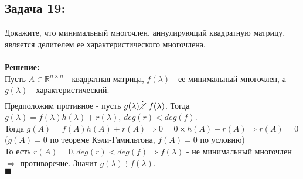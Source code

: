 \documentclass[a4paper,12pt,titlepage,final]{article}
\begin{document}
\subsection*{Задача 19:}
\noindent Докажите, что минимальный многочлен, аннулирующий квадратную матрицу, является 
делителем ее характеристического многочлена. \\ \\
\textbf{\underline{Решение:}} \\
Пусть $A \in \mathbb{R}^{n \times n}$ - квадратная матрица, $f(\lambda)$ - ее минимальный многочлен, 
а $g(\lambda)$ - характеристический. \\
Предположим противное - пусть $g(\lambda) \mathrel{\vdots \hspace{-0.60em} \diagup} f(\lambda)$.
Тогда $g(\lambda) = f(\lambda)h(\lambda) + r(\lambda)$, $deg(r) < deg(f)$.\\Тогда
$g(A) = f(A)h(A) + r(A) \Rightarrow 0 = 0 \times h(A) + r(A) \Rightarrow r(A) = 0$\\
($g(A) = 0$ по теореме Кэли-Гамильтона, $f(A) = 0$ по условию) \\
То есть $r(A) = 0, deg(r) < deg(f) \Rightarrow f(\lambda)$ - не минимальный многочлен $\Rightarrow$ противоречие.
Значит $g(\lambda)$ $\vdots$ $f(\lambda)$. \\ $\blacksquare$ \\ \\ \\ 


\end{document}

